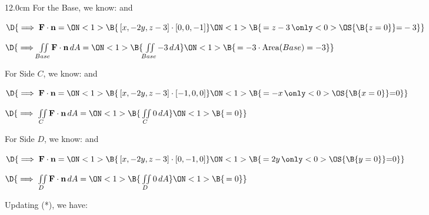 \begin{frame}
\begin{columns}\begin{column}{12.0cm}
\scriptsize
For the Base, we know: \quad 
{} \quad and \quad 
{}

\vspace{0.1cm}

$\D{\implies {\bf F} \cdot {\bf n} = 
\ON<1>{\B{ \, [x,-2y,z-3] \cdot [0,0,-1]}}
\ON<1>{\B{\, = z - 3 \,\only<0>{\OS{\B{ z=0 }}}{ = } -3}}}$ 

\vspace{0.2cm}

$\D{\implies \iint \limits_{Base} {\bf F} \cdot {\bf n}\, dA = 
\ON<1>{\B{\, \iint \limits_{Base} -3 \, dA }}
\ON<1>{\B{\, = -3 \cdot \text{Area}(Base) = -3}}}$ 

\vspace{0.4cm}

For Side $C$, we know: \quad 
{} \quad and \quad 
{}

\vspace{0.1cm}

$\D{\implies {\bf F} \cdot {\bf n} = 
\ON<1>{\B{ \, [x,-2y,z-3] \cdot [-1,0,0]}}
\ON<1>{\B{\, = -x \,\only<0>{\OS{\B{ x=0 }}}{ = } 0}}}$ 

\vspace{0.2cm}

$\D{\implies \iint \limits_{C} {\bf F} \cdot {\bf n}\, dA = 
\ON<1>{\B{\, \iint \limits_{C} 0 \, dA }}
\ON<1>{\B{\, = 0}}}$

\vspace{0.4cm}

For Side $D$, we know: \quad 
{} \quad and \quad 
{}

\vspace{0.1cm}

$\D{\implies {\bf F} \cdot {\bf n} = 
\ON<1>{\B{ \, [x,-2y,z-3] \cdot [0,-1,0]}}
\ON<1>{\B{\, = 2y \,\only<0>{\OS{\B{ y=0 }}}{ = } 0}}}$ 

\vspace{0.2cm}

$\D{\implies \iint \limits_{D} {\bf F} \cdot {\bf n}\, dA = 
\ON<1>{\B{\, \iint \limits_{D} 0 \, dA }}
\ON<1>{\B{\, = 0}}}$

\vspace{0.4cm}

Updating (*), we have:


\end{column}
\end{columns}
\end{frame}
